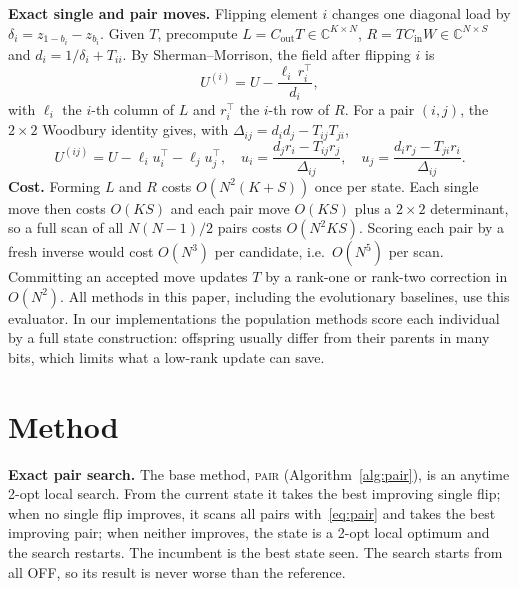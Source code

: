 \documentclass[runningheads]{llncs}
\begin{document}
\textbf{Exact single and pair moves.} Flipping element $i$ changes one diagonal load by $\delta_i=z_{1-b_i}-z_{b_i}$. Given $T$, precompute $L=C_{\mathrm{out}}T\in\mathbb C^{K\times N}$, $R=TC_{\mathrm{in}}W\in\mathbb C^{N\times S}$ and $d_i=1/\delta_i+T_{ii}$. By Sherman--Morrison, the field after flipping $i$ is
\begin{equation}
U^{(i)}=U-\frac{\ell_i\,r_i^{\top}}{d_i},
\end{equation}
with $\ell_i$ the $i$-th column of $L$ and $r_i^\top$ the $i$-th row of $R$. For a pair $(i,j)$, the $2\times2$ Woodbury identity gives, with $\Delta_{ij}=d_id_j-T_{ij}T_{ji}$,
\begin{equation}
U^{(ij)}=U-\ell_i u_i^{\top}-\ell_j u_j^{\top},\quad u_i=\frac{d_jr_i-T_{ij}r_j}{\Delta_{ij}},\quad u_j=\frac{d_ir_j-T_{ji}r_i}{\Delta_{ij}}.
\label{eq:pair}
\end{equation}
\textbf{Cost.} Forming $L$ and $R$ costs $O(N^2(K+S))$ once per state. Each single move then costs $O(KS)$ and each pair move $O(KS)$ plus a $2\times2$ determinant, so a full scan of all $N(N-1)/2$ pairs costs $O(N^2KS)$. Scoring each pair by a fresh inverse would cost $O(N^3)$ per candidate, i.e.\ $O(N^5)$ per scan. Committing an accepted move updates $T$ by a rank-one or rank-two correction in $O(N^2)$. All methods in this paper, including the evolutionary baselines, use this evaluator. In our implementations the population methods score each individual by a full state construction: offspring usually differ from their parents in many bits, which limits what a low-rank update can save.

\section{Method}\label{sec:method}
\textbf{Exact pair search.} The base method, \textsc{pair} (Algorithm~\ref{alg:pair}), is an anytime 2-opt local search. From the current state it takes the best improving single flip; when no single flip improves, it scans all pairs with~\eqref{eq:pair} and takes the best improving pair; when neither improves, the state is a 2-opt local optimum and the search restarts. The incumbent is the best state seen. The search starts from all OFF, so its result is never worse than the reference.
\end{document}
